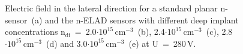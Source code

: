 \documentclass[a4paper,11pt]{article}
\begin{document}
\begin{figure}[t!]
\begin{center}
\begin{minipage}[h]{0.17\linewidth}
\end{minipage}
\hfill 
\begin{minipage}[h]{0.17\linewidth}
\end{minipage}
\hfill 
\begin{minipage}[h]{0.17\linewidth}
\end{minipage}
\hfill 
\begin{minipage}[h]{0.1\linewidth}
\end{minipage}
\hfill 
\caption{Electric field in the lateral direction for a standard planar n-sensor~(a) and the n-ELAD sensors with different deep implant concentrations $\mathrm{n_{di}}$~=~2.0$\mathrm{\cdot10^{15}\,cm^{-3}}$~(b), 2.4$\mathrm{\cdot10^{15}\,cm^{-3}}$~(c), 2.8$\mathrm{\cdot10^{15}\,cm^{-3}}$~(d) and 3.0$\mathrm{\cdot10^{15}\,cm^{-3}}$~(e) at U~=~280\,V.}
\label{fig:ef}
\end{center}
\end{figure}
\end{document}
